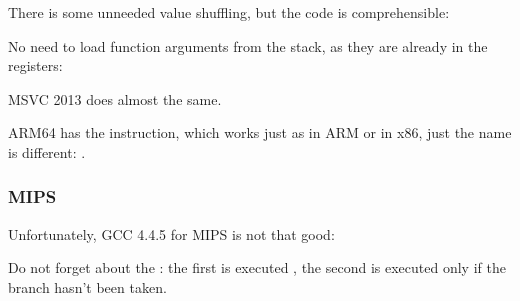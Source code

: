 

There is some unneeded value shuffling, but the code is comprehensible:




No need to load function arguments from the stack, as they are already in the registers:



MSVC 2013 does almost the same.


ARM64 has the  instruction, which works just as  in ARM or  in x86, just the name is different:
.



\subsubsection{MIPS}

Unfortunately, GCC 4.4.5 for MIPS is not that good:



Do not forget about the : the first  is executed  , 
the second  is executed only if the branch hasn't been taken.

